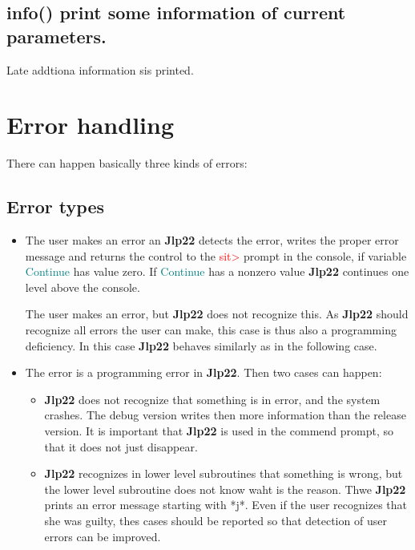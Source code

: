 \subsection{\textcolor{VioletRed}{info}() print some information of current parameters.} 
\label{info} 
\begin{note} 
Late addtiona information sis printed. 
\end{note} 
\section{Error handling} 
\label{error} 
There can happen basically three kinds of errors: 
\subsection{Error types} 
\label{errortype} 
\begin{itemize} 
\item The user makes an error an \textbf{Jlp22} detects the error, writes the proper error message 
and returns the control to the \textcolor{Red}{sit>} prompt in the console, if variable \textcolor{teal}{Continue} has value zero. If \textcolor{teal}{Continue} has a nonzero value 
\textbf{Jlp22} continues one level above the console. 
 
The user makes an error, but \textbf{Jlp22} does not recognize this. As \textbf{Jlp22} should recognize all errors the 
user can make, this case is thus also a programming deficiency. 
In this case \textbf{Jlp22} 
behaves similarly as in the following case. 
 
\item The error is a programming error in \textbf{Jlp22}. Then two cases can happen: 
\begin{itemize} 
\item \textbf{Jlp22} does not recognize that something is in error, and the system crashes. The debug 
version writes then more information than the release version. It is important that \textbf{Jlp22} is 
used in the commend prompt, so that it does not just disappear. 
\item \textbf{Jlp22} recognizes in lower level subroutines that something is wrong, but the 
lower level subroutine does not know waht is the reason. Thwe \textbf{Jlp22} prints an error message 
starting with *j*. Even if the user recognizes that she was guilty, thes cases should be reported 
so that detection of user errors can be improved. 
\end{itemize} 
\end{itemize} 
